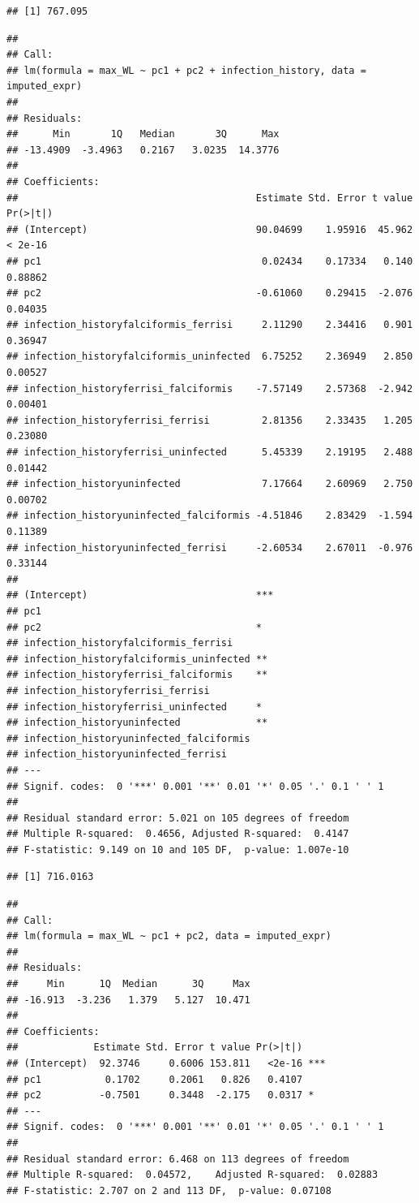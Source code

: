 \documentclass[
]{article}
\begin{document}
\begin{verbatim}
## [1] 767.095
\end{verbatim}

\begin{verbatim}
## 
## Call:
## lm(formula = max_WL ~ pc1 + pc2 + infection_history, data = imputed_expr)
## 
## Residuals:
##      Min       1Q   Median       3Q      Max 
## -13.4909  -3.4963   0.2167   3.0235  14.3776 
## 
## Coefficients:
##                                         Estimate Std. Error t value Pr(>|t|)
## (Intercept)                             90.04699    1.95916  45.962  < 2e-16
## pc1                                      0.02434    0.17334   0.140  0.88862
## pc2                                     -0.61060    0.29415  -2.076  0.04035
## infection_historyfalciformis_ferrisi     2.11290    2.34416   0.901  0.36947
## infection_historyfalciformis_uninfected  6.75252    2.36949   2.850  0.00527
## infection_historyferrisi_falciformis    -7.57149    2.57368  -2.942  0.00401
## infection_historyferrisi_ferrisi         2.81356    2.33435   1.205  0.23080
## infection_historyferrisi_uninfected      5.45339    2.19195   2.488  0.01442
## infection_historyuninfected              7.17664    2.60969   2.750  0.00702
## infection_historyuninfected_falciformis -4.51846    2.83429  -1.594  0.11389
## infection_historyuninfected_ferrisi     -2.60534    2.67011  -0.976  0.33144
##                                            
## (Intercept)                             ***
## pc1                                        
## pc2                                     *  
## infection_historyfalciformis_ferrisi       
## infection_historyfalciformis_uninfected ** 
## infection_historyferrisi_falciformis    ** 
## infection_historyferrisi_ferrisi           
## infection_historyferrisi_uninfected     *  
## infection_historyuninfected             ** 
## infection_historyuninfected_falciformis    
## infection_historyuninfected_ferrisi        
## ---
## Signif. codes:  0 '***' 0.001 '**' 0.01 '*' 0.05 '.' 0.1 ' ' 1
## 
## Residual standard error: 5.021 on 105 degrees of freedom
## Multiple R-squared:  0.4656, Adjusted R-squared:  0.4147 
## F-statistic: 9.149 on 10 and 105 DF,  p-value: 1.007e-10
\end{verbatim}

\begin{verbatim}
## [1] 716.0163
\end{verbatim}

\begin{verbatim}
## 
## Call:
## lm(formula = max_WL ~ pc1 + pc2, data = imputed_expr)
## 
## Residuals:
##     Min      1Q  Median      3Q     Max 
## -16.913  -3.236   1.379   5.127  10.471 
## 
## Coefficients:
##             Estimate Std. Error t value Pr(>|t|)    
## (Intercept)  92.3746     0.6006 153.811   <2e-16 ***
## pc1           0.1702     0.2061   0.826   0.4107    
## pc2          -0.7501     0.3448  -2.175   0.0317 *  
## ---
## Signif. codes:  0 '***' 0.001 '**' 0.01 '*' 0.05 '.' 0.1 ' ' 1
## 
## Residual standard error: 6.468 on 113 degrees of freedom
## Multiple R-squared:  0.04572,    Adjusted R-squared:  0.02883 
## F-statistic: 2.707 on 2 and 113 DF,  p-value: 0.07108
\end{verbatim}
\end{document}
